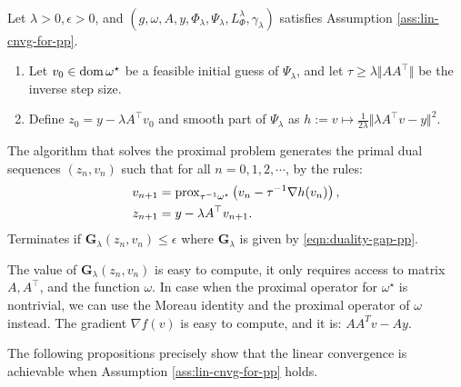 \documentclass[12pt]{article}
\begin{document}
        \begin{definition}\;\label{def:ista-inner-lp}\\
            Let $\lambda > 0, \epsilon > 0$, and $(g, \omega, A, y, \Phi_\lambda, \Psi_\lambda, L^\lambda_{\Phi} ,\gamma_\lambda)$ satisfies Assumption \ref{ass:lin-cnvg-for-pp}. 
            \begin{enumerate}[nosep]
                \item Let $v_0\in\operatorname{dom} \omega^\star$ be a feasible initial guess of $\Psi_{\lambda}$, and let $\tau \ge \lambda\Vert AA^\top\Vert$ be the inverse step size. 
                \item Define $z_0 = y - \lambda A^\top v_0$ and smooth part of $\Psi_\lambda$ as $h := v \mapsto \frac{1}{2\lambda}\Vert \lambda A^\top v - y\Vert^2$. 
            \end{enumerate}
            The algorithm that solves the proximal problem generates the primal dual sequences $(z_n, v_n)$ such that for all $n = 0, 1, 2, \cdots$, by the rules: 
            \begin{align*}
                v_{n + 1} &= \operatorname{prox}_{\tau^{-1} \omega^\star}\left(
                    v_{n} - \tau^{-1}\nabla h(v_n)
                \right), 
                \\
                z_{n + 1} &= y - \lambda A^\top v_{n + 1}. 
            \end{align*}
            Terminates if $\mathbf G_\lambda(z_n, v_n) \le \epsilon$ where $\mathbf G_\lambda$ is given by \eqref{eqn:duality-gap-pp}. 
        \end{definition}
        \begin{remark}
            The value of $\mathbf G_\lambda(z_n, v_n)$ is easy to compute, it only requires access to matrix $A, A^\top$, and the function $\omega$. 
            In case when the proximal operator for $\omega^\star$ is nontrivial, we can use the Moreau identity and the proximal operator of $\omega$ instead. 
            The gradient $\nabla f(v)$ is easy to compute, and it is: $AA^T v - Ay$.
        \end{remark}
        \par
        The following propositions precisely show that the linear convergence is achievable when Assumption \ref{ass:lin-cnvg-for-pp} holds. 
\end{document}
